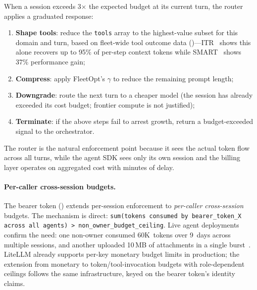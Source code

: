 \begin{opportunity}
When a session exceeds 3$\times$ the expected budget at its
current turn, the router applies a graduated response:
\begin{enumerate}[nosep]
  \item \textbf{Shape tools}: reduce the \texttt{tools} array to
        the highest-value subset for this domain and turn, based
        on fleet-wide tool outcome data
        ()---ITR~\cite{itr2026} shows this
        alone recovers up to 95\% of per-step context tokens while
        SMART~\cite{smart2026} shows 37\% performance gain;
  \item \textbf{Compress}: apply FleetOpt's $\gamma$ to reduce the
        remaining prompt length;
  \item \textbf{Downgrade}: route the next turn to a cheaper model
        (the session has already exceeded its cost budget; frontier
        compute is not justified);
  \item \textbf{Terminate}: if the above steps fail to
        arrest growth, return a budget-exceeded signal to the
        orchestrator.
\end{enumerate}
The router is the natural enforcement point because it sees the
actual token flow across all turns, while the agent SDK sees only its
own session and the billing layer operates on aggregated cost with
minutes of delay.

\paragraph{Per-caller cross-session budgets.}
The bearer token () extends per-session
enforcement to \emph{per-caller cross-session} budgets.  The
mechanism is direct: \texttt{sum(tokens consumed by bearer\_token\_X
across all agents) > non\_owner\_budget\_ceiling}.  Live agent
deployments confirm the need: one non-owner consumed 60K~tokens over
9~days across multiple sessions, and another uploaded 10\,MB of
attachments in a single burst~\cite{agentschaos2025}.  LiteLLM
already supports per-key monetary budget limits in production; the
extension from monetary to token/tool-invocation budgets with
role-dependent ceilings follows the same infrastructure, keyed on the
bearer token's identity claims.


\end{opportunity}
